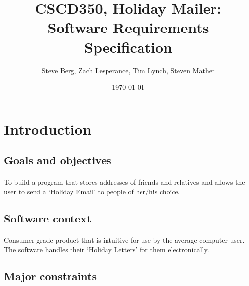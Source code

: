 \documentclass{article}
\title{CSCD350, Holiday Mailer: Software Requirements Specification}
\author{Steve Berg, Zach Lesperance, Tim Lynch, Steven Mather}
\date{\today}
\begin{document}
\maketitle{}
\pagebreak

\section{Introduction}

\subsection{Goals and objectives}
\paragraph{}
To build a program that stores addresses of friends and relatives and allows the user to send a `Holiday Email' to people of her/his choice.


\subsection{Software context}
\paragraph{}
Consumer grade product that is intuitive for use by the average computer user. The software handles their `Holiday Letters' for them electronically.

\subsection{Major constraints}
\end{document}
